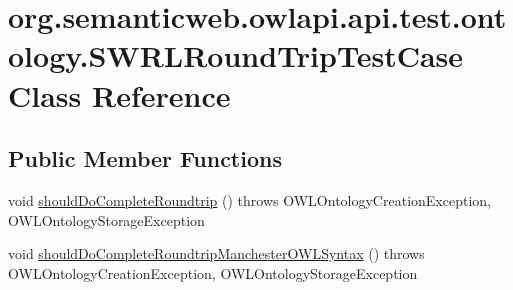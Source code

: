 \hypertarget{classorg_1_1semanticweb_1_1owlapi_1_1api_1_1test_1_1ontology_1_1_s_w_r_l_round_trip_test_case}{\section{org.\-semanticweb.\-owlapi.\-api.\-test.\-ontology.\-S\-W\-R\-L\-Round\-Trip\-Test\-Case Class Reference}
\label{classorg_1_1semanticweb_1_1owlapi_1_1api_1_1test_1_1ontology_1_1_s_w_r_l_round_trip_test_case}
}
\subsection*{Public Member Functions}
\begin{DoxyCompactItemize}
\item 
void \hyperlink{classorg_1_1semanticweb_1_1owlapi_1_1api_1_1test_1_1ontology_1_1_s_w_r_l_round_trip_test_case_a118f1e78aa5f456dd3664d3f912fb581}{should\-Do\-Complete\-Roundtrip} ()  throws O\-W\-L\-Ontology\-Creation\-Exception,             O\-W\-L\-Ontology\-Storage\-Exception 
\item 
void \hyperlink{classorg_1_1semanticweb_1_1owlapi_1_1api_1_1test_1_1ontology_1_1_s_w_r_l_round_trip_test_case_a4ccf56aa6059bf23c90fe3b70213b49a}{should\-Do\-Complete\-Roundtrip\-Manchester\-O\-W\-L\-Syntax} ()  throws O\-W\-L\-Ontology\-Creation\-Exception, O\-W\-L\-Ontology\-Storage\-Exception 
\end{DoxyCompactItemize}


